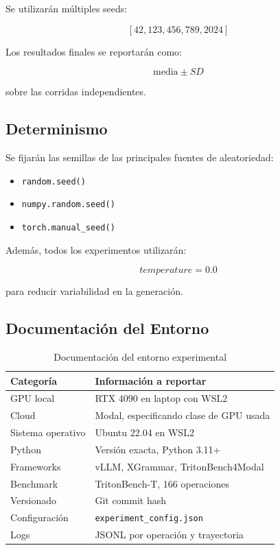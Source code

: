 \documentclass[12pt]{article}
\begin{document}
Se utilizarán múltiples seeds:

\[
[42, 123, 456, 789, 2024]
\]

Los resultados finales se reportarán como:

\[
\text{media} \pm SD
\]

sobre las corridas independientes.

\subsection{Determinismo}

Se fijarán las semillas de las principales fuentes de aleatoriedad:

\begin{itemize}
    \item \texttt{random.seed()}
    \item \texttt{numpy.random.seed()}
    \item \texttt{torch.manual\_seed()}
\end{itemize}

Además, todos los experimentos utilizarán:

\[
temperature = 0.0
\]

para reducir variabilidad en la generación.

\subsection{Documentación del Entorno}

\begin{table}[H]
\centering
\begin{tabular}{p{} p{}}
\toprule
\textbf{Categoría} & \textbf{Información a reportar} \\
\midrule
GPU local & RTX 4090 en laptop con WSL2 \\
Cloud & Modal, especificando clase de GPU usada \\
Sistema operativo & Ubuntu 22.04 en WSL2 \\
Python & Versión exacta, Python 3.11+ \\
Frameworks & vLLM, XGrammar, TritonBench4Modal \\
Benchmark & TritonBench-T, 166 operaciones \\
Versionado & Git commit hash \\
Configuración & \texttt{experiment\_config.json} \\
Logs & JSONL por operación y trayectoria \\
\bottomrule
\end{tabular}
\caption{Documentación del entorno experimental}
\end{table}
\end{document}
